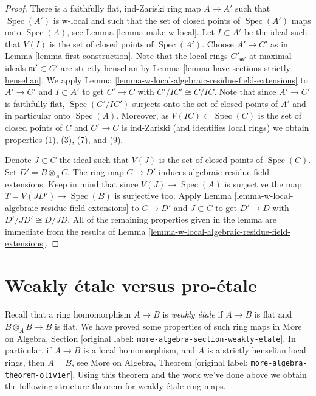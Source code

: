 \documentclass[10pt,a4paper]{article}
\theoremstyle{plain}
\theoremstyle{definition}
\theoremstyle{remark}
\numberwithin{equation}{subsection}
\def\Spec{\mathop{\mathrm{Spec}}}
\begin{document}
\begin{proof}
There is a faithfully flat, ind-Zariski ring map $A \to A'$ such that
$\Spec(A')$ is w-local and such that the set of closed points of
$\Spec(A')$ maps onto $\Spec(A)$, see Lemma \ref{lemma-make-w-local}.
Let $I \subset A'$ be the ideal such that $V(I)$ is the set
of closed points of $\Spec(A')$.
Choose $A' \to C'$ as in Lemma \ref{lemma-first-construction}.
Note that the local rings $C'_{\mathfrak m'}$ at maximal ideals
$\mathfrak m' \subset C'$ are strictly henselian by
Lemma \ref{lemma-have-sections-strictly-henselian}.
We apply Lemma \ref{lemma-w-local-algebraic-residue-field-extensions}
to $A' \to C'$ and $I \subset A'$ to get $C' \to C$ with $C'/IC' \cong C/IC$.
Note that since $A' \to C'$ is faithfully flat, $\Spec(C'/IC')$
surjects onto the set of closed points of $A'$ and in particular
onto $\Spec(A)$. Moreover, as $V(IC) \subset \Spec(C)$
is the set of closed points of $C$ and $C' \to C$ is ind-Zariski
(and identifies local rings) we obtain properties (1), (3), (7), and (9).

\medskip\noindent
Denote $J \subset C$ the ideal such that $V(J)$ is the set of closed
points of $\Spec(C)$. Set $D' = B \otimes_A C$. The ring
map $C \to D'$ induces algebraic residue field extensions. Keep in mind that
since $V(J) \to \Spec(A)$ is surjective the map $T = V(JD') \to \Spec(B)$
is surjective too. Apply
Lemma \ref{lemma-w-local-algebraic-residue-field-extensions}
to $C \to D'$ and $J \subset C$ to get 
$D' \to D$ with $D'/JD' \cong D/JD$.
All of the remaining properties given in the lemma are
immediate from the results of
Lemma \ref{lemma-w-local-algebraic-residue-field-extensions}.
\end{proof}








\section{Weakly \'etale versus pro-\'etale}
\label{section-weakly-etale}

\noindent
Recall that a ring homomorphism $A \to B$ is {\it weakly \'etale}
if $A \to B$ is flat and $B \otimes_A B \to B$ is flat. We have
proved some properties of such ring maps in
More on Algebra, Section \textnormal{[original label: \nolinkurl{more-algebra-section-weakly-etale}]}.
In particular, if $A \to B$ is a local homomorphism, and $A$ is a
strictly henselian local rings, then $A = B$, see
More on Algebra, Theorem \textnormal{[original label: \nolinkurl{more-algebra-theorem-olivier}]}.
Using this theorem and the work we've done above we obtain
the following structure theorem for weakly \'etale ring maps.
\end{document}
